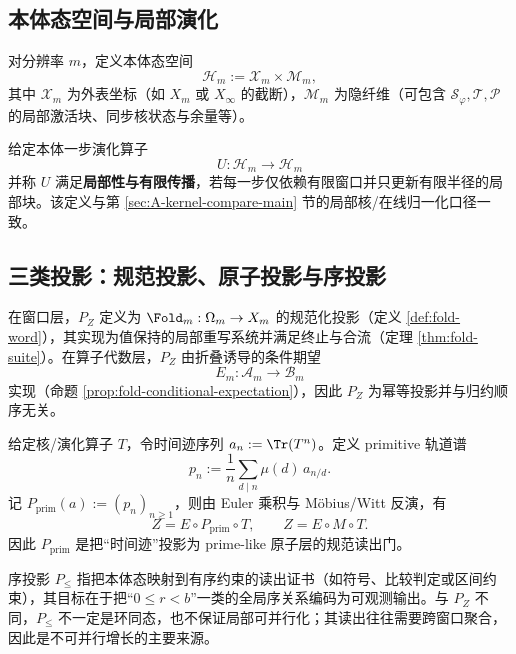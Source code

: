 \subsection{本体态空间与局部演化}\label{subsec:pom-state-evolution}
\begin{definition}[分辨率态空间]\label{def:pom-state-space}
对分辨率 $m$，定义本体态空间
\[
\mathcal{H}_m:=\mathcal{X}_m\times \mathcal{M}_m,
\]
其中 $\mathcal{X}_m$ 为外表坐标（如 $X_m$ 或 $X_\infty$ 的截断），$\mathcal{M}_m$ 为隐纤维（可包含 $\mathcal{S}_\varphi,\mathcal{T},\mathcal{P}$ 的局部激活块、同步核状态与余量等）。
\end{definition}

\begin{definition}[局部性与有限传播]\label{def:pom-locality}
给定本体一步演化算子
\[
U:\mathcal{H}_m\to\mathcal{H}_m
\]
并称 \(U\) 满足\textbf{局部性与有限传播}，若每一步仅依赖有限窗口并只更新有限半径的局部块。该定义与第 \ref{sec:A-kernel-compare-main} 节的局部核/在线归一化口径一致。
\end{definition}

\subsection{三类投影：规范投影、原子投影与序投影}\label{subsec:pom-projections}
\begin{definition}[规范投影 $P_Z$]\label{def:pom-proj-norm}
在窗口层，$P_Z$ 定义为 $\Fold_m:\Omega_m\to X_m$ 的规范化投影（定义 \ref{def:fold-word}），其实现为值保持的局部重写系统并满足终止与合流（定理 \ref{thm:fold-suite}）。在算子代数层，$P_Z$ 由折叠诱导的条件期望
\[
E_m:\mathcal{A}_m\to\mathcal{B}_m
\]
实现（命题 \ref{prop:fold-conditional-expectation}），因此 $P_Z$ 为幂等投影并与归约顺序无关。
\end{definition}

\begin{definition}\label{def:pom-proj-prim}
给定核/演化算子 $T$，令时间迹序列 $a_n:=\Tr(T^n)$。定义 primitive 轨道谱
\[
p_n:=\frac{1}{n}\sum_{d\mid n}\mu(d)\,a_{n/d}.
\]
记 $P_{\mathrm{prim}}(a):=(p_n)_{n\ge 1}$，则由 Euler 乘积与 Möbius/Witt 反演，有
\[
Z=E\circ P_{\mathrm{prim}}\circ T,
\qquad
Z=E\circ M\circ T.
\]
因此 $P_{\mathrm{prim}}$ 是把“时间迹”投影为 prime-like 原子层的规范读出门。
\end{definition}

\begin{definition}[序投影 $P_{\le}$]\label{def:pom-proj-order}
序投影 $P_{\le}$ 指把本体态映射到有序约束的读出证书（如符号、比较判定或区间约束），其目标在于把“$0\le r<b$”一类的全局序关系编码为可观测输出。与 $P_Z$ 不同，$P_{\le}$ 不一定是环同态，也不保证局部可并行化；其读出往往需要跨窗口聚合，因此是不可并行增长的主要来源。
\end{definition}

